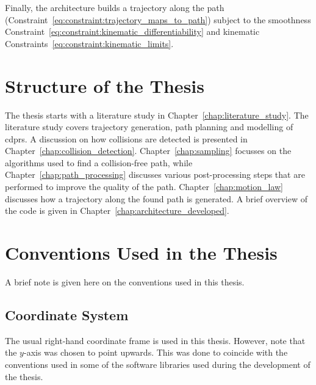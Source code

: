 		Finally, the architecture builds a trajectory along the path
		(Constraint~\ref{eq:constraint:trajectory_maps_to_path}) subject to the
		smoothness Constraint~\ref{eq:constraint:kinematic_differentiability}
		and kinematic Constraints~\ref{eq:constraint:kinematic_limits}.

	\section{Structure of the Thesis}

		The thesis starts with a literature study in
		Chapter~\ref{chap:literature_study}. The literature study covers
		trajectory generation, path planning and modelling of \glspl{cdpr}.  A
		discussion on how collisions are detected is presented in
		Chapter~\ref{chap:collision_detection}. Chapter~\ref{chap:sampling}
		focusses on the algorithms used to find a collision-free path, while
		Chapter~\ref{chap:path_processing} discusses various post-processing
		steps that are performed to improve the quality of the path.
		Chapter~\ref{chap:motion_law} discusses how a trajectory along the found
		path is generated. A brief overview of the code is given in
		Chapter~\ref{chap:architecture_developed}.

	\section{Conventions Used in the Thesis}

		A brief note is given here on the conventions used in this thesis.

		\subsection{Coordinate System}

			The usual right-hand coordinate frame is used in this thesis.
			However, note that the $y$-axis was chosen to point upwards. This
			was done to coincide with the conventions used in some of the
			software libraries used during the development of the thesis.

